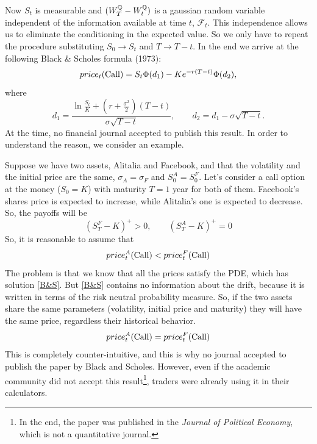 Now $S_t$ is measurable and $(W_T^{\mathbb{Q}}-W_t^{\mathbb{Q}})$ is a gaussian random variable independent of the information available at time $t$, $\mathcal{F}_t $. This independence allows us to eliminate the conditioning in the expected value. So we only have to repeat the procedure substituting $S_0\to S_t$ and $T\to T-t$. In the end we arrive at the following Black \& Scholes formula (1973):
\begin{equation}\label{B&S}
    price_t(\operatorname{Call}) = S_t\Phi(d_1)-Ke^{-r(T-t)}\Phi(d_2),
\end{equation}
where
\begin{equation}\label{d}
    d_1 = \dfrac{\ln\frac{S_t}{K} + \left(r+\frac{\sigma^2}{2}\right)(T-t)}{\sigma\sqrt{T-t}}, \qquad d_2 = d_1 - \sigma\sqrt{T-t}.
\end{equation}
At the time, no financial journal accepted to publish this result. In order to understand the reason, we consider an example.
\begin{example}{}{}{}
    Suppose we have two assets, Alitalia and Facebook, and that the volatility and the initial price are the same, $\sigma_A = \sigma_F$ and $S_0^A = S_0^F$. Let's consider a call option at the money ($S_0=K$) with maturity $T=1$ year for both of them. Facebook's shares price is expected to increase, while Alitalia's one is expected to decrease. So, the payoffs will be
    \begin{equation*}
        (S_T^F-K)^+ > 0, \qquad (S_T^A-K)^+ = 0
    \end{equation*}
    So, it is reasonable to assume that
    \begin{equation*}
        price^A_t(\operatorname{Call}) < price^F_t(\operatorname{Call})
    \end{equation*}
    The problem is that we know that all the prices satisfy the PDE, which has solution \eqref{B&S}. But \eqref{B&S} contains no information about the drift, because it is written in terms of the risk neutral probability measure. So, if the two assets share the same parameters (volatility, initial price and maturity) they will have the same price, regardless their historical behavior.
    \begin{equation*}
        price^A_t(\operatorname{Call}) = price^F_t(\operatorname{Call})
    \end{equation*}
    This is completely counter-intuitive, and this is why no journal accepted to publish the paper by Black and Scholes. However, even if the academic community did not accept this result\footnote{In the end, the paper was published in the \emph{Journal of Political Economy}, which is not a quantitative journal.}, traders were already using it in their calculators.
\end{example}

